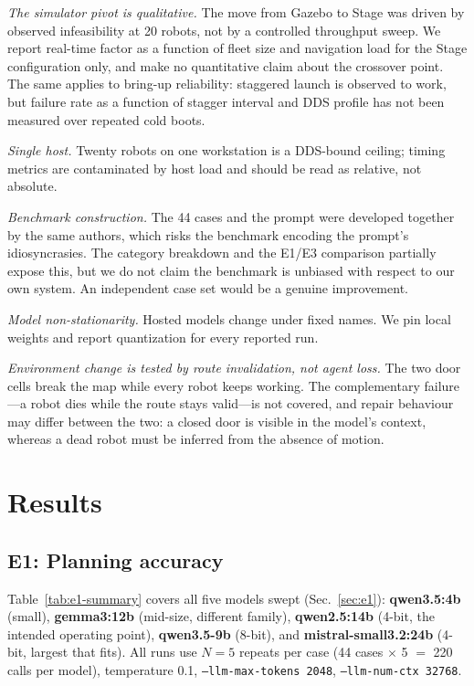 \documentclass[10pt,twocolumn]{article}
\newcommand{\code}[1]{\texttt{\small #1}}
\begin{document}
\emph{The simulator pivot is qualitative.} The move from Gazebo to Stage was
driven by observed infeasibility at 20 robots, not by a controlled throughput
sweep. We report real-time factor as a function of fleet size and navigation
load for the Stage configuration only, and make no quantitative claim about the
crossover point. The same applies to bring-up reliability: staggered launch is
observed to work, but failure rate as a function of stagger interval and DDS
profile has not been measured over repeated cold boots.

\emph{Single host.} Twenty robots on one workstation is a DDS-bound ceiling;
timing metrics are contaminated by host load and should be read as relative,
not absolute.

\emph{Benchmark construction.} The 44 cases and the prompt were developed
together by the same authors, which risks the benchmark encoding the prompt's
idiosyncrasies. The category breakdown and the E1/E3 comparison partially
expose this, but we do not claim the benchmark is unbiased with respect to our
own system. An independent case set would be a genuine improvement.

\emph{Model non-stationarity.} Hosted models change under fixed names. We pin
local weights and report quantization for every reported run.

\emph{Environment change is tested by route invalidation, not agent loss.} The
two door cells break the map while every robot keeps working. The complementary
failure---a robot dies while the route stays valid---is not covered, and repair
behaviour may differ between the two: a closed door is visible in the model's
context, whereas a dead robot must be inferred from the absence of motion.

\section{Results}

\subsection{E1: Planning accuracy}
\label{sec:e1-results}

Table~\ref{tab:e1-summary} covers all five models swept (Sec.~\ref{sec:e1}):
\textbf{qwen3.5:4b} (small), \textbf{gemma3:12b} (mid-size, different family),
\textbf{qwen2.5:14b} (4-bit, the intended operating point),
\textbf{qwen3.5-9b} (8-bit), and \textbf{mistral-small3.2:24b} (4-bit, largest
that fits). All runs use $N{=}5$ repeats per case (44 cases $\times$ 5 $=$ 220
calls per model), temperature 0.1, \code{--llm-max-tokens 2048},
\code{--llm-num-ctx 32768}.
\end{document}
